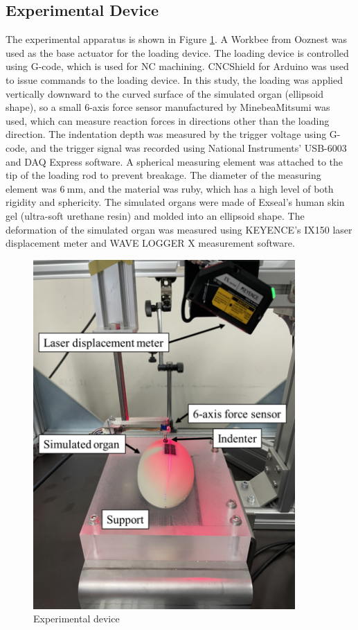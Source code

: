 \subsection*{Experimental Device}
The experimental apparatus is shown in Figure \ref{fig:expdeviceynu}.
A Workbee from Ooznest was used as the base actuator for the loading device. The loading device is controlled using G-code, which is used for NC machining. CNCShield for Arduino was used to issue commands to the loading device. In this study, the loading was applied vertically downward to the curved surface of the simulated organ (ellipsoid shape), so a small 6-axis force sensor manufactured by MinebeaMitsumi was used, which can measure reaction forces in directions other than the loading direction. The indentation depth was measured by the trigger voltage using G-code, and the trigger signal was recorded using National Instruments' USB-6003 and DAQ Express software. A spherical measuring element was attached to the tip of the loading rod to prevent breakage. The diameter of the measuring element was $\SI{6}{\milli \meter}$, and the material was ruby, which has a high level of both rigidity and sphericity. The simulated organs were made of Exseal's human skin gel (ultra-soft urethane resin) and molded into an ellipsoid shape. The deformation of the simulated organ was measured using KEYENCE's IX150 laser displacement meter and WAVE LOGGER X measurement software.

\begin{figure}%
	\centering
   \quad
   \includegraphics[width=10cm]{Images/appendix/ynu/fig1experimentaldevice.png}%
   \caption{Experimental device}%
   \label{fig:expdeviceynu}%
\end{figure}


